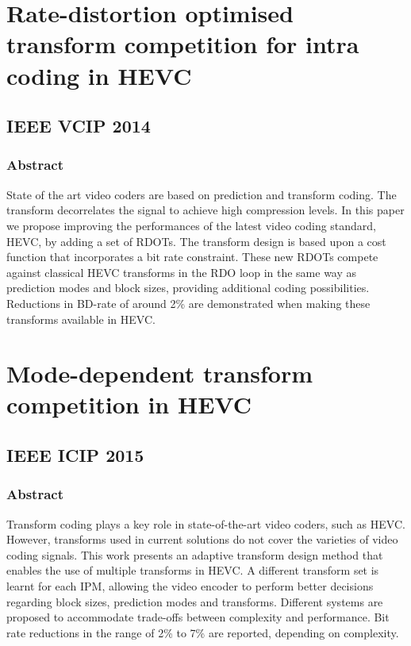 \documentclass[11pt,a4paper,openright,twoside]{book}
\numberwithin{equation}{section} %
\numberwithin{figure}{section} %
\numberwithin{table}{section} %
\begin{document}
\section*{Rate-distortion optimised transform competition for intra coding in
HEVC}
\label{sec:rate_distortion_optimised_transform_competition_for_intra_coding_in_hevc}

\subsection*{IEEE VCIP 2014}
\label{sub:ieee_vcip_2014_tc}

\subsubsection*{Abstract}
\label{ssub:tc_abstract}

State of the art video coders are based on prediction and transform coding.
The transform decorrelates the signal to achieve high compression levels.
In this paper we propose improving the performances of the latest video coding
standard, \acs{HEVC}, by adding a set of \acp{RDOT}.
The transform design is based upon a cost function that incorporates a bit
rate constraint.
These new \acp{RDOT} compete against classical \acs{HEVC} transforms in the
\ac{RDO} loop in the same way as prediction modes and block sizes, providing
additional coding possibilities.
Reductions in \acs{BD}-rate of around 2\% are demonstrated when making these
transforms available in \acs{HEVC}.

\section*{Mode-dependent transform competition in HEVC}
\label{sec:mode_dependent_transform_competition_in_hevc}

\subsection*{IEEE ICIP 2015}
\label{sub:ieee_icip_2015_mdtc}

\subsubsection*{Abstract}
\label{ssub:mdtc_abstract}

Transform coding plays a key role in state-of-the-art video coders, such as
\acs{HEVC}.
However, transforms used in current solutions do not cover the varieties
of video coding signals.
This work presents an adaptive transform design method that enables the use of
multiple transforms in \acs{HEVC}.
A different transform set is learnt for each \acl{IPM}, allowing the video
encoder to perform better decisions regarding block sizes, prediction modes
and transforms.
Different systems are proposed to accommodate trade-offs between complexity
and performance.
Bit rate reductions in the range of 2\% to 7\% are reported, depending on
complexity.
\end{document}

